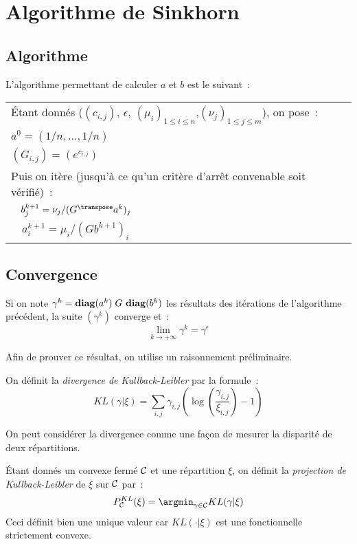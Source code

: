 \section{Algorithme de Sinkhorn}

\subsection{Algorithme}
L'algorithme permettant de calculer $a$ et $b$ est le suivant~:

\begin{tabular}{|p{\textwidth}|}
\hline \vspace{0pt}
 \label{algorithme}
\'Etant donnés ($(c_{i,j})$, $\epsilon$, $(\mu_i)_{1\le i \le n}$,$(\nu_j)_{1 \le j \le m}$), on pose~: \\
$a^0 = (1/n, \ldots, 1/n)$\\
$(G_{i,j}) = (e^{c_{i,j}})$\\
Puis on itère (jusqu'à ce qu'un critère d'arrêt convenable soit vérifié)~: \\
$\quad b^{k+1}_j = \nu_j / (G^\transpose a^k)_j$\\
$\quad a^{k+1}_i = \mu_i /(G b^{k+1})_i$ \\
\hline
\end{tabular}

\subsection{Convergence}
\begin{theoreme}
\label{th:sink_cv}
Si on note $\gamma^k = \operatorname{\mathbf{diag}}(a^k)\;G\,\operatorname{\mathbf{diag}}(b^k)$ les résultats des itérations de l'algorithme précédent, la suite $(\gamma^k)$ converge et~:
\[\lim_{k \rightarrow +\infty} \gamma^k = \gamma^\epsilon\]
\end{theoreme}

Afin de prouver ce résultat, on utilise un raisonnement préliminaire.
\begin{definition}
On définit la \emph{divergence de Kullback-Leibler} par la formule~:
\begin{equation}\label{eq:kl}
KL(\gamma | \xi) = \sum_{i,j} \gamma_{i,j} \left(\log\left(\frac{\gamma_{i,j}}{\xi_{i,j}} \right) -1 \right)
\end{equation}
\end{definition}
On peut considérer la divergence comme une façon de mesurer la disparité de deux répartitions.
\begin{definition}
 \'Etant donnés un convexe fermé $\operatorname{\mathcal{C}}$ et une répartition $\xi$, on définit la \emph{projection de Kullback-Leibler} de $\xi$ sur $\operatorname{\mathcal{C}}$ par~:
\begin{equation}\label{eq:pkl}
P^{KL}_{\Ccal} (\xi) = \argmin_{\gamma \in \Ccal} KL(\gamma | \xi)
\end{equation}
Ceci définit bien une unique valeur car $KL(\cdot | \xi)$ est une fonctionnelle strictement convexe.
\end{definition}


